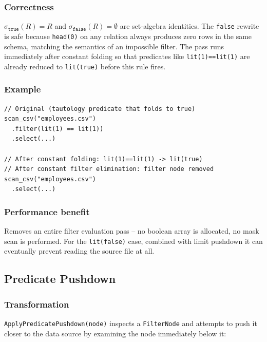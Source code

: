\documentclass[12pt,a4paper]{article}
\begin{document}
\subsubsection*{Correctness}

$\sigma_{\mathtt{true}}(R) = R$ and $\sigma_{\mathtt{false}}(R) = \emptyset$
are set-algebra identities.  The \texttt{false} rewrite is safe because
\texttt{head(0)} on any relation always produces zero rows in the same
schema, matching the semantics of an impossible filter.  The pass runs
immediately after constant folding so that predicates like
\texttt{lit(1)==lit(1)} are already reduced to \texttt{lit(true)} before
this rule fires.

\subsubsection*{Example}

\begin{lstlisting}
// Original (tautology predicate that folds to true)
scan_csv("employees.csv")
  .filter(lit(1) == lit(1))
  .select(...)

// After constant folding: lit(1)==lit(1) -> lit(true)
// After constant filter elimination: filter node removed
scan_csv("employees.csv")
  .select(...)
\end{lstlisting}

\subsubsection*{Performance benefit}

Removes an entire filter evaluation pass -- no boolean array is allocated,
no mask scan is performed.  For the \texttt{lit(false)} case, combined with
limit pushdown it can eventually prevent reading the source file at all.

\subsection{Predicate Pushdown}

\subsubsection*{Transformation}

\texttt{ApplyPredicatePushdown(node)} inspects a \texttt{FilterNode} and
attempts to push it closer to the data source by examining the node
immediately below it:
\end{document}
